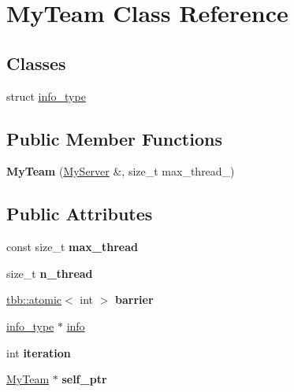 \hypertarget{classMyTeam}{}\section{My\+Team Class Reference}
\label{classMyTeam}
\subsection*{Classes}
\begin{DoxyCompactItemize}
\item 
struct \hyperlink{structMyTeam_1_1info__type}{info\+\_\+type}
\end{DoxyCompactItemize}
\subsection*{Public Member Functions}
\begin{DoxyCompactItemize}
\item 
\hypertarget{classMyTeam_a5b015469a6730015d0e300f6633cf317}{}{\bfseries My\+Team} (\hyperlink{class____kmp_1_1rml_1_1omp__server}{My\+Server} \&, size\+\_\+t max\+\_\+thread\+\_\+)\label{classMyTeam_a5b015469a6730015d0e300f6633cf317}

\end{DoxyCompactItemize}
\subsection*{Public Attributes}
\begin{DoxyCompactItemize}
\item 
\hypertarget{classMyTeam_a33f51946abbc2525ae43ab6fbeaf6ff0}{}const size\+\_\+t {\bfseries max\+\_\+thread}\label{classMyTeam_a33f51946abbc2525ae43ab6fbeaf6ff0}

\item 
\hypertarget{classMyTeam_a95075fd4ffe40c116f5df17f35bb9007}{}size\+\_\+t {\bfseries n\+\_\+thread}\label{classMyTeam_a95075fd4ffe40c116f5df17f35bb9007}

\item 
\hypertarget{classMyTeam_ab570a6fefb00bd80fd6c504a1d1d39f6}{}\hyperlink{structtbb_1_1atomic}{tbb\+::atomic}$<$ int $>$ {\bfseries barrier}\label{classMyTeam_ab570a6fefb00bd80fd6c504a1d1d39f6}

\item 
\hyperlink{structMyTeam_1_1info__type}{info\+\_\+type} $\ast$ \hyperlink{classMyTeam_afb85d6f47b539b64d9b7088ea5921ec5}{info}
\item 
\hypertarget{classMyTeam_a7c55193d800eb8c4394751aeb49c1e5d}{}int {\bfseries iteration}\label{classMyTeam_a7c55193d800eb8c4394751aeb49c1e5d}

\item 
\hypertarget{classMyTeam_a6d029684f552a58a7f3a3faf9a544df6}{}\hyperlink{classMyTeam}{My\+Team} $\ast$ {\bfseries self\+\_\+ptr}\label{classMyTeam_a6d029684f552a58a7f3a3faf9a544df6}

\end{DoxyCompactItemize}


